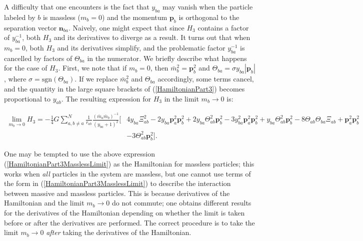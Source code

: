 \documentclass[aps,onecolumn,notitlepage,eqsecnum,nofootinbib,floatfix,superscriptaddress]{revtex4-1}
\begin{document}
A difficulty that one encounters is the fact that $y_{ba}$ may vanish when the particle labeled by $b$ is massless ($m_b=0$) and the momentum $\textbf{p}_b$ is orthogonal to the separation vector $\textbf{n}_{ba}$. Naively, one might expect that since $H_3$ contains a factor of $y_{ba}^{-1}$, both $H_3$ and its derivatives to diverge as a result. It turns out that when $m_b=0$, both $H_3$ and its derivatives simplify, and the problematic factor $y_{ba}^{-1}$ is cancelled by factors of $\Theta_{ba}$ in the numerator. We briefly describe what happens for the case of $H_3$.  First, we note that if $m_{b}= 0$, then $\bar{m}_b^2=\textbf{p}_b^2$ and $\Theta_{ba}= \sigma y_{ba}|\mathbf{p}_{b}|$, where
$\sigma= \mathrm{sgn}(\Theta_{ba})$. If we replace $\bar{m}_b^2$ and $\Theta_{ba}$ accordingly, some terms cancel, and the quantity in the large square brackets of (\ref{HamiltonianPart3}) becomes proportional to $y_{ab}$. The resulting expression for $H_3$ in the limit $m_b \rightarrow 0$ is:
\begin{widetext}
\begin{equation} \label{HamiltonianPart3MasslessLimit}
\begin{aligned}
  \lim_{m_b \rightarrow 0} H_{3}= -\frac{1}{4}G\sum_{a,b\neq a}^{N}\frac{1}{r_{ab}}\frac{\left(\bar{m}_a\bar{m}_b\right)^{-1}}{\left(y_{ba}+1\right)^{2}} \biggl[ & 4y_{ba}\Xi^{2}_{ab}- 2y_{ba}\mathbf{p}^{2}_{a}\mathbf{p}^{2}_{b}+ 2y_{ba}\Theta^{2}_{ab}\mathbf{p}^{2}_{b} -3y^2_{ba}\mathbf{p}^{2}_{a}\mathbf{p}^{2}_{b}+ y_{ba}\Theta^{2}_{ab}\mathbf{p}^{2}_{b}- 8\Theta_{ab}\Theta_{ba}\Xi_{ab} + \mathbf{p}^{2}_{a}\mathbf{p}^{2}_{b} \\
  & - 3\Theta^{2}_{ab}\mathbf{p}^{2}_{b} \biggr].
\end{aligned}
\end{equation}
\end{widetext}

\noindent One may be tempted to use the above expression (\ref{HamiltonianPart3MasslessLimit}) as the Hamiltonian for massless particles; this works when \textit{all} particles in the system are massless, but one cannot use terms of the form in (\ref{HamiltonianPart3MasslessLimit}) to describe the interaction between massive and massless particles. This is because derivatives of the Hamiltonian and the limit $m_b \rightarrow 0$ do not commute; one obtains different results for the derivatives of the Hamiltonian depending on whether the limit is taken before or after the derivatives are performed. The correct procedure is to take the limit $m_b \rightarrow 0$ \textit{after} taking the derivatives of the Hamiltonian.
\end{document}
